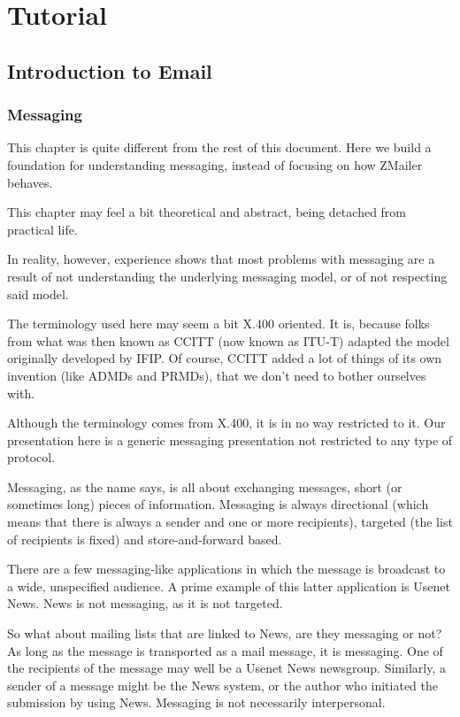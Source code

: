 \section{Tutorial}


\subsection{Introduction to Email}


\subsubsection{Messaging}

This chapter is quite different from the rest of this document.
Here we build a foundation for understanding messaging, instead
of focusing on how ZMailer behaves.

This chapter may feel a bit theoretical and abstract, being detached
from practical life.

In reality, however, experience shows that most problems with messaging
are a result of not understanding the underlying messaging model, or of
not respecting said model.

The terminology used here may seem a bit X.400 oriented.
It is, because folks from what was then known as CCITT (now known as ITU-T)
adapted the model originally developed by IFIP.
Of course, CCITT added a lot of things of its own invention (like
ADMDs and PRMDs), that we don't need to bother ourselves with.

Although the terminology comes from X.400, it is in no way restricted to it.
Our presentation here is a generic messaging presentation not restricted
to any type of protocol.

Messaging, as the name says, is all about exchanging messages,
short (or sometimes long) pieces of information.
Messaging is always directional (which means that there is always
a sender and one or more recipients), targeted (the list of recipients
is fixed) and store-and-forward based.

There are a few messaging-like applications in which the message is
broadcast to a wide, unspecified audience.
A prime example of this latter application is Usenet News.
News is not messaging, as it is not targeted.

So what about mailing lists that are linked to News, are they messaging or not?
As long as the message is transported as a mail message, it is messaging.
One of the recipients of the message may well be a Usenet News newsgroup.
Similarly, a sender of a message might be the News system, or the author
who initiated the submission by using News. Messaging is not necessarily
interpersonal.

